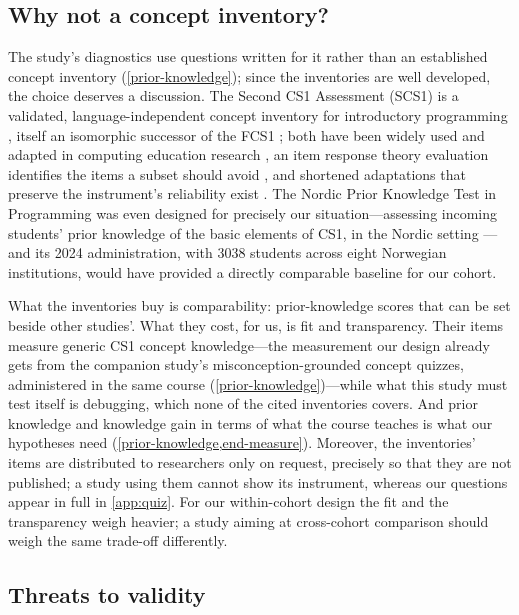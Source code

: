 \subsection{Why not a concept inventory?}
\label{inventory-discussion}

The study's diagnostics use questions written for it rather than an
established concept inventory (\cref{prior-knowledge}); since the
inventories are well developed, the choice deserves a discussion.
The Second CS1 Assessment (SCS1) is a validated, language-independent
concept inventory for introductory programming \autocite{SCS1}, itself
an isomorphic successor of the FCS1 \autocite{FCS1}; both have been
widely used and adapted in computing education research
\autocite{FCS1SCS1Uses}, an item response theory evaluation identifies
the items a subset should avoid \autocite{SCS1IRT}, and shortened
adaptations that preserve the instrument's reliability exist
\autocite{SCS1Short}.
The Nordic Prior Knowledge Test in Programming was even designed for
precisely our situation---assessing incoming students' prior knowledge
of the basic elements of CS1, in the Nordic setting
\autocite{NPKT}---and its 2024 administration, with \num{3038} students
across eight Norwegian institutions, would have provided a directly
comparable baseline for our cohort.

What the inventories buy is comparability: prior-knowledge scores that
can be set beside other studies'.
What they cost, for us, is fit and transparency.
Their items measure generic CS1 concept knowledge---the measurement our
design already gets from the companion study's misconception-grounded
concept quizzes, administered in the same course
(\cref{prior-knowledge})---while what this study must test itself is
debugging, which none of the cited inventories covers.
And prior knowledge and knowledge gain in terms of what the course
teaches is what our hypotheses need
(\cref{prior-knowledge,end-measure}).
Moreover, the inventories' items are distributed to researchers only on
request, precisely so that they are not published; a study using them
cannot show its instrument, whereas our questions appear in full in
\cref{app:quiz}.
For our within-cohort design the fit and the transparency weigh
heavier; a study aiming at cross-cohort comparison should weigh the
same trade-off differently.

\subsection{Threats to validity}

